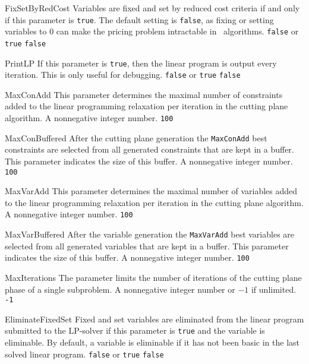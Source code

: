 \parameter
{FixSetByRedCost}
{Variables 
 are fixed and set by reduced cost criteria if and only if this
 parameter is {\tt true}. 
 The default setting is {\tt false}, as
 fixing or setting variables to 0 can make the pricing problem intractable
 in \bap\ algorithms.
}
{{\tt false} or {\tt true}}
{{\tt false}}

\parameter
{PrintLP}
{If this parameter is {\tt true}, then the linear program is output
 every iteration. 
 This is only useful for debugging.}
{{\tt false} or {\tt true}}
{{\tt false}}

\parameter
{MaxConAdd}
{This parameter
 determines the maximal number of constraints added to the 
 linear programming
 relaxation per iteration in the cutting plane algorithm.
}
{A nonnegative integer number.}
{{\tt 100}}

\parameter
{MaxConBuffered}
{After the cutting plane generation
 the {\tt MaxConAdd}
 best constraints are selected from all generated constraints that
 are kept in a buffer. This parameter indicates the size of this buffer.
}
{A nonnegative integer number.}
{{\tt 100}}

\parameter
{MaxVarAdd}
{This
 parameter determines the maximal number of variables added to the 
 linear programming
 relaxation per iteration in the cutting plane algorithm.
}
{A nonnegative integer number.}
{{\tt 100}}

\parameter
{MaxVarBuffered}
{After
 the variable generation the {\tt MaxVarAdd}
 best variables are selected from all generated variables that
 are kept in a buffer. This parameter indicates the size of this buffer.
}
{A nonnegative integer number.}
{{\tt 100}}

\parameter
{MaxIterations}
{The
 parameter limits the  number of iterations of the cutting plane phase 
 of a single subproblem.
}
{A nonnegative integer number or $-1$ if unlimited.}
{{\tt -1}}

\parameter
{EliminateFixedSet}
{Fixed
  and set variables are eliminated from the linear program submitted to the
 LP-solver if this parameter is {\tt true} and the variable is
 eliminable. By default, a variable is eliminable if it has not been
 basic in the last solved linear program.
}
{{\tt false} or {\tt true}}
{{\tt false}}


